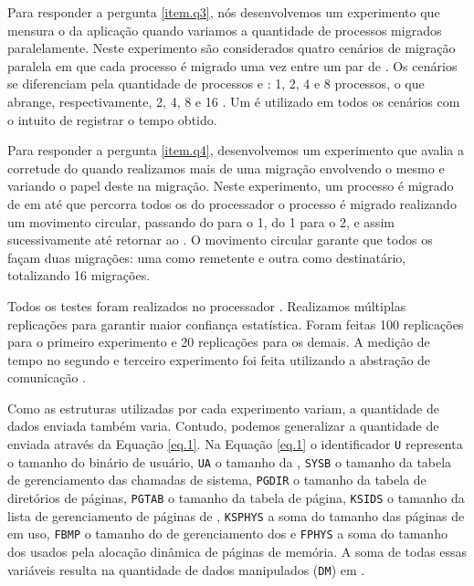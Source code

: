 Para responder a pergunta \ref{item.q3}, nós desenvolvemos um experimento que mensura o \downtime da aplicação quando variamos a quantidade de processos migrados paralelamente. Neste experimento são considerados quatro cenários de migração paralela em que cada processo é migrado uma vez entre um par de \clusters. Os cenários se diferenciam pela quantidade de processos e \clusters: 1, 2, 4 e 8 processos, o que abrange, respectivamente, 2, 4, 8 e 16 \cclusters. Um \iocluster é utilizado em todos os cenários com o intuito de registrar o tempo obtido.

Para responder a pergunta \ref{item.q4}, desenvolvemos um experimento que avalia a corretude do \daemon quando realizamos mais de uma migração envolvendo o mesmo \cluster e variando o papel deste na migração. Neste experimento, um processo é migrado de \cluster em \cluster até que percorra todos os \cclusters do processador \ie o processo é migrado realizando um movimento circular, passando do  para o 1, do 1 para o 2, e assim sucessivamente até retornar ao . O movimento circular garante que todos os \clusters façam duas migrações: uma como remetente e outra como destinatário, totalizando 16 migrações. 

Todos os testes foram realizados no processador \mppa. Realizamos múltiplas replicações para garantir maior confiança estatística. Foram feitas 100 replicações para o primeiro experimento e 20 replicações para os demais. A medição de tempo no segundo e terceiro experimento foi feita utilizando a abstração de comunicação \sync.

Como as estruturas utilizadas por cada experimento variam, a quantidade de dados enviada também varia. Contudo, podemos generalizar a quantidade de \bytes enviada através da Equação \ref{eq.1}. Na Equação \ref{eq.1} o identificador \texttt{U} representa o tamanho do binário de usuário, \texttt{UA} o tamanho da \uarea, \texttt{SYSB} o tamanho da tabela de gerenciamento das chamadas de sistema, \texttt{PGDIR} o tamanho da tabela de diretórios de páginas, \texttt{PGTAB} o tamanho da tabela de página, \texttt{KSIDS} o tamanho da lista de gerenciamento de páginas de , \texttt{KSPHYS} a soma do tamanho das páginas de  em uso, \texttt{FBMP} o tamanho do \bitmap de gerenciamento dos \frames e \texttt{FPHYS} a soma do tamanho dos \frames usados pela alocação dinâmica de páginas de memória. A soma de todas essas variáveis resulta na quantidade de dados manipulados (\texttt{DM}) em \bytes.

